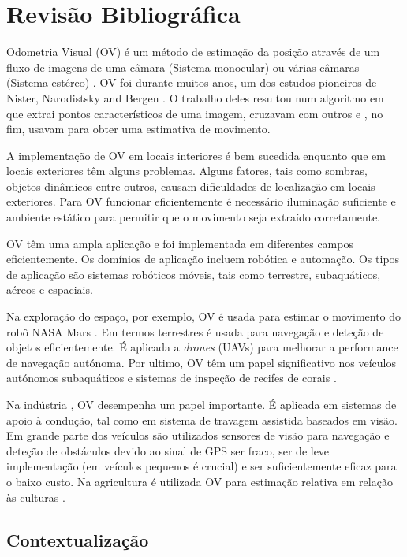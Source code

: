 \chapter{Revisão Bibliográfica}\label{chap:odometria visual}


Odometria Visual (OV) é um método de estimação da posição através de um fluxo de imagens de uma câmara (Sistema monocular) ou várias câmaras (Sistema estéreo) \cite{Ericson2018}. OV foi durante muitos anos, um dos estudos pioneiros de Nister, Narodistsky and Bergen \cite{Nisterb}. O trabalho deles resultou num algoritmo em que extrai pontos característicos de  uma imagem, cruzavam com outros e , no fim, usavam para obter uma estimativa de movimento. 

A implementação de OV em locais interiores é bem sucedida enquanto que em locais exteriores têm alguns problemas. Alguns fatores, tais como sombras, objetos dinâmicos entre outros, causam  dificuldades de localização em locais exteriores. Para OV funcionar eficientemente é necessário iluminação suficiente e ambiente estático para permitir que o movimento seja extraído corretamente. 

OV têm uma ampla aplicação e foi implementada em diferentes campos eficientemente. Os domínios de aplicação incluem robótica e automação. Os tipos de aplicação são sistemas robóticos móveis, tais como terrestre, subaquáticos, aéreos e espaciais.
 
Na exploração do espaço, por exemplo, OV é usada para estimar o movimento do robô NASA Mars \cite{Cheng}. Em termos terrestres é usada para navegação e deteção de objetos eficientemente. É aplicada a \textit{drones} (UAVs) para melhorar a performance de navegação autónoma. Por ultimo, OV têm um papel significativo nos veículos autónomos subaquáticos e sistemas de inspeção de recifes de corais \cite{Aqel2016}.

Na indústria , OV desempenha um papel importante. É aplicada em sistemas de apoio à condução, tal como em sistema de travagem assistida baseados em visão.  Em grande parte dos veículos são utilizados sensores de visão para navegação e deteção de obstáculos devido ao sinal de GPS ser fraco, ser de leve implementação (em veículos pequenos é crucial) e ser suficientemente eficaz para o baixo custo.  Na agricultura é utilizada OV para estimação relativa em relação às culturas \cite{ericson2008visual,Mendes2016}.


\section{Contextualização}

